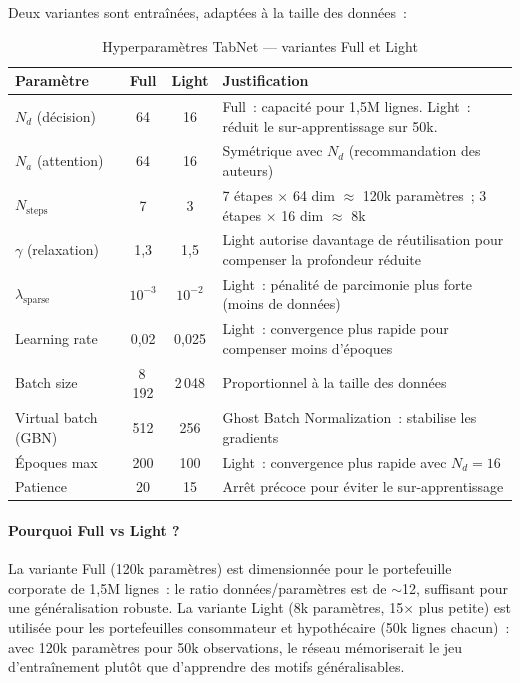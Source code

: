 \documentclass[12pt, a4paper, twoside, openright]{report}
\theoremstyle{definition}
\begin{document}
Deux variantes sont entraînées, adaptées à la taille des données~:

\begin{table}[htbp]
\centering
\caption{Hyperparamètres TabNet --- variantes Full et Light}
\label{tab:tabnet-config}
\begin{tabular}{lccp{5.5cm}}
\toprule
Paramètre & Full & Light & Justification \\
\midrule
$N_d$ (décision) & 64 & 16 & Full~: capacité pour 1{,}5M lignes. Light~: réduit le sur-apprentissage sur 50k. \\
$N_a$ (attention) & 64 & 16 & Symétrique avec $N_d$ (recommandation des auteurs) \\
$N_{\text{steps}}$ & 7 & 3 & 7 étapes $\times$ 64 dim $\approx$ 120k paramètres~; 3 étapes $\times$ 16 dim $\approx$ 8k \\
$\gamma$ (relaxation) & 1{,}3 & 1{,}5 & Light autorise davantage de réutilisation pour compenser la profondeur réduite \\
$\lambda_{\text{sparse}}$ & $10^{-3}$ & $10^{-2}$ & Light~: pénalité de parcimonie plus forte (moins de données) \\
Learning rate & 0{,}02 & 0{,}025 & Light~: convergence plus rapide pour compenser moins d'époques \\
Batch size & 8\,192 & 2\,048 & Proportionnel à la taille des données \\
Virtual batch (GBN) & 512 & 256 & Ghost Batch Normalization~: stabilise les gradients \\
Époques max & 200 & 100 & Light~: convergence plus rapide avec $N_d = 16$ \\
Patience & 20 & 15 & Arrêt précoce pour éviter le sur-apprentissage \\
\bottomrule
\end{tabular}
\end{table}

\paragraph{Pourquoi Full vs Light ?} La variante Full (120k paramètres) est dimensionnée pour le portefeuille corporate de 1{,}5M lignes~: le ratio données/paramètres est de $\sim$12, suffisant pour une généralisation robuste. La variante Light (8k paramètres, 15$\times$ plus petite) est utilisée pour les portefeuilles consommateur et hypothécaire (50k lignes chacun)~: avec 120k paramètres pour 50k observations, le réseau mémoriserait le jeu d'entraînement plutôt que d'apprendre des motifs généralisables.
\end{document}
